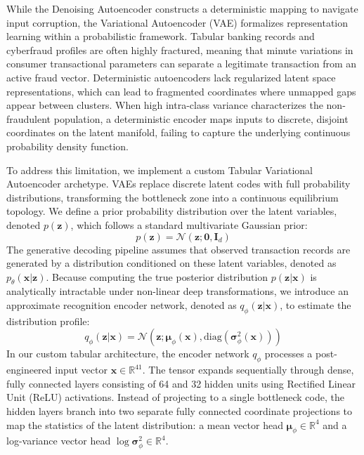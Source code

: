 While the Denoising Autoencoder constructs a deterministic mapping to navigate input corruption, the Variational Autoencoder (VAE) formalizes representation learning within a probabilistic framework. Tabular banking records and cyberfraud profiles are often highly fractured, meaning that minute variations in consumer transactional parameters can separate a legitimate transaction from an active fraud vector. Deterministic autoencoders lack regularized latent space representations, which can lead to fragmented coordinates where unmapped gaps appear between clusters. When high intra-class variance characterizes the non-fraudulent population, a deterministic encoder maps inputs to discrete, disjoint coordinates on the latent manifold, failing to capture the underlying continuous probability density function.

To address this limitation, we implement a custom Tabular Variational Autoencoder archetype. VAEs replace discrete latent codes with full probability distributions, transforming the bottleneck zone into a continuous equilibrium topology. We define a prior probability distribution over the latent variables, denoted $p(\mathbf{z})$, which follows a standard multivariate Gaussian prior:
\begin{equation}\label{eq:7.6}
    p(\mathbf{z}) = \mathcal{N}(\mathbf{z}; \mathbf{0}, \mathbf{I}_d)
\end{equation}
The generative decoding pipeline assumes that observed transaction records are generated by a distribution conditioned on these latent variables, denoted as $p_\theta(\mathbf{x}|\mathbf{z})$. Because computing the true posterior distribution $p(\mathbf{z}|\mathbf{x})$ is analytically intractable under non-linear deep transformations, we introduce an approximate recognition encoder network, denoted as $q_\phi(\mathbf{z}|\mathbf{x})$, to estimate the distribution profile:
\begin{equation}\label{eq:7.7}
    q_\phi(\mathbf{z}|\mathbf{x}) = \mathcal{N}\!\left(\mathbf{z}; \boldsymbol{\mu}_\phi(\mathbf{x}), \text{diag}\!\left(\boldsymbol{\sigma}^2_\phi(\mathbf{x})\right)\right)
\end{equation}
In our custom tabular architecture, the encoder network $q_\phi$ processes a post-engineered input vector $\mathbf{x} \in \mathbb{R}^{41}$. The tensor expands sequentially through dense, fully connected layers consisting of 64 and 32 hidden units using Rectified Linear Unit (ReLU) activations. Instead of projecting to a single bottleneck code, the hidden layers branch into two separate fully connected coordinate projections to map the statistics of the latent distribution: a mean vector head $\boldsymbol{\mu}_\phi \in \mathbb{R}^4$ and a log-variance vector head $\log \boldsymbol{\sigma}^2_\phi \in \mathbb{R}^4$.


